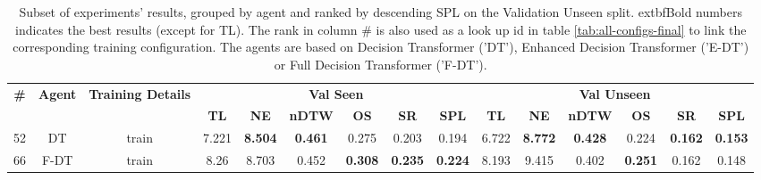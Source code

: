 \begin{table}
\centering
\caption{\label{tab:rezero}Subset of experiments' results, grouped by agent and ranked by descending SPL on the Validation Unseen split. 	extbf{Bold} numbers indicates the best results (except for TL). The rank in column \# is also used as a look up id in table \ref{tab:all-configs-final} to link the corresponding training configuration.     \newline The agents are based on Decision Transformer ('DT'), Enhanced Decision Transformer ('E-DT') or Full Decision Transformer ('F-DT').}
\begin{tabular}{@{\hskip3pt}c@{\hskip3pt}c@{\hskip3pt}c@{\hskip3pt}c@{\hskip3pt}c@{\hskip3pt}c@{\hskip3pt}c@{\hskip3pt}c@{\hskip3pt}c@{\hskip3pt}c@{\hskip3pt}c@{\hskip3pt}c@{\hskip3pt}c@{\hskip3pt}c@{\hskip3pt}c}
\toprule
\textbf{\#} & \textbf{Agent} & \textbf{Training Details} & \multicolumn{6}{c}{\textbf{Val Seen}} & \multicolumn{6}{c}{\textbf{Val Unseen}} \\
 \textbf{~} &     \textbf{~} &                \textbf{~} &       \textbf{TL} &     \textbf{NE} &   \textbf{nDTW} &     \textbf{OS} &     \textbf{SR} &    \textbf{SPL} &         \textbf{TL} &     \textbf{NE} &   \textbf{nDTW} &     \textbf{OS} &     \textbf{SR} &    \textbf{SPL} \\
\midrule
         52 &             DT &                     train &             7.221 &  \textbf{8.504} &  \textbf{0.461} &           0.275 &           0.203 &           0.194 &               6.722 &  \textbf{8.772} &  \textbf{0.428} &           0.224 &  \textbf{0.162} &  \textbf{0.153} \\
         66 &           F-DT &                     train &              8.26 &           8.703 &           0.452 &  \textbf{0.308} &  \textbf{0.235} &  \textbf{0.224} &               8.193 &           9.415 &           0.402 &  \textbf{0.251} &           0.162 &           0.148 \\
\bottomrule
\end{tabular}
\end{table}
